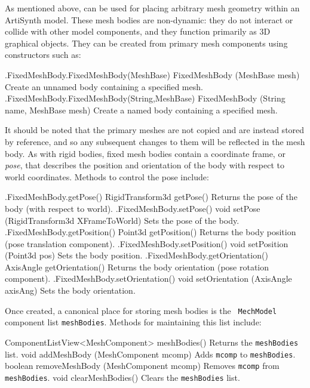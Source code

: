As mentioned above,  can be used for
placing arbitrary mesh geometry within an ArtiSynth model.  These mesh
bodies are non-dynamic: they do not interact or collide with other
model components, and they function primarily as 3D graphical
objects. They can be created from primary mesh components using
constructors such as:
%
\begin{methodtable}{0.5}{0.5}
\midline
%
\methodentry
{\mech .FixedMeshBody.FixedMeshBody(MeshBase)}%
{FixedMeshBody (MeshBase mesh)}%
{Create an unnamed body containing a specified mesh.}%
%
\methodentry
{\mech .FixedMeshBody.FixedMeshBody(String,MeshBase)}%
{FixedMeshBody (String name, MeshBase mesh)}%
{Create a named body containing a specified mesh.}%
%
\midline
\end{methodtable}
%
It should be noted that the primary meshes are not copied and are
instead stored by reference, and so any subsequent changes to them
will be reflected in the mesh body. As with rigid bodies, fixed mesh
bodies contain a coordinate frame, or {\it pose}, that describes the
position and orientation of the body with respect to world
coordinates. Methods to control the pose include:
%
\begin{methodtable}{0.5}{0.5}
\midline
%
\methodentry
{\mech .FixedMeshBody.getPose()}%
{RigidTransform3d getPose()}%
{Returns the pose of the body (with respect to world).}%
%
\methodentry
{\mech .FixedMeshBody.setPose()}%
{void setPose (RigidTransform3d XFrameToWorld)}%
{Sets the pose of the body.}%
\methodspace{0.5em}
%
\methodentry
{\mech .FixedMeshBody.getPosition()}%
{Point3d getPosition()}%
{Returns the body position (pose translation component).}%
%
\methodentry
{\mech .FixedMeshBody.setPosition()}%
{void setPosition (Point3d pos)}%
{Sets the body position.}%
\methodspace{0.5em}
%
\methodentry
{\mech .FixedMeshBody.getOrientation()}%
{AxisAngle getOrientation()}%
{Returns the body orientation (pose rotation component).}%
%
\methodentry
{\mech .FixedMeshBody.setOrientation()}%
{void setOrientation (AxisAngle axisAng)}%
{Sets the body orientation.}%
%
\midline
\end{methodtable}
%
Once created, a canonical place for storing mesh bodies is the {\tt
MechModel} component list {\tt meshBodies}. Methods for
maintaining this list include:
%
\begin{methodtable}{0.5}{0.5}
\midline
%
%
{ComponentListView<MeshComponent> meshBodies()}%
{Returns the {\tt meshBodies} list.}%
%
%
{void addMeshBody (MeshComponent mcomp)}%
{Adds {\tt mcomp} to {\tt meshBodies}.}%
%
%
{boolean removeMeshBody (MeshComponent mcomp)}%
{Removes {\tt mcomp} from {\tt meshBodies}.}%
%
%
{void clearMeshBodies()}%
{Clears the {\tt meshBodies} list.}%
%
\midline
\end{methodtable}

